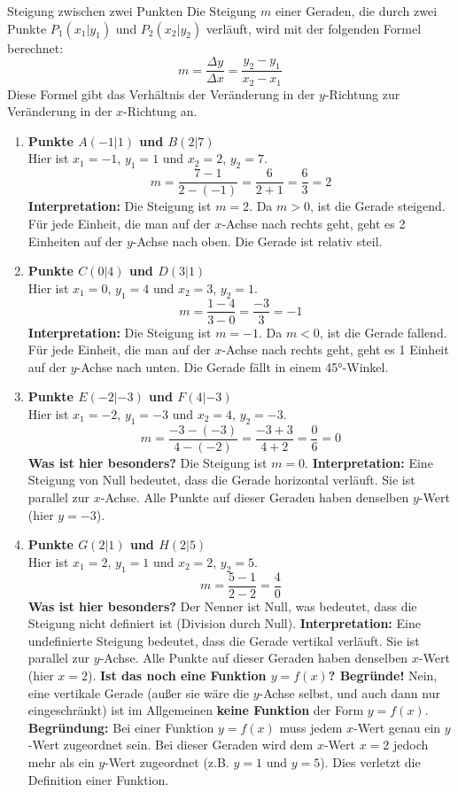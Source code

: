 \begin{loesungsumgebung}{Steigung zwischen zwei Punkten}
Die Steigung $m$ einer Geraden, die durch zwei Punkte $P_1(x_1|y_1)$ und $P_2(x_2|y_2)$ verläuft, wird mit der folgenden Formel berechnet:
$$ m = \frac{\Delta y}{\Delta x} = \frac{y_2 - y_1}{x_2 - x_1} $$
Diese Formel gibt das Verhältnis der Veränderung in der $y$-Richtung zur Veränderung in der $x$-Richtung an.

\begin{enumerate}
    \item \textbf{Punkte $A(-1|1)$ und $B(2|7)$} \\
    Hier ist $x_1 = -1$, $y_1 = 1$ und $x_2 = 2$, $y_2 = 7$.
    $$ m = \frac{7 - 1}{2 - (-1)} = \frac{6}{2 + 1} = \frac{6}{3} = 2 $$
    \textbf{Interpretation:} Die Steigung ist $m=2$. Da $m > 0$, ist die Gerade steigend. Für jede Einheit, die man auf der $x$-Achse nach rechts geht, geht es 2 Einheiten auf der $y$-Achse nach oben. Die Gerade ist relativ steil.

    \item \textbf{Punkte $C(0|4)$ und $D(3|1)$} \\
    Hier ist $x_1 = 0$, $y_1 = 4$ und $x_2 = 3$, $y_2 = 1$.
    $$ m = \frac{1 - 4}{3 - 0} = \frac{-3}{3} = -1 $$
    \textbf{Interpretation:} Die Steigung ist $m=-1$. Da $m < 0$, ist die Gerade fallend. Für jede Einheit, die man auf der $x$-Achse nach rechts geht, geht es 1 Einheit auf der $y$-Achse nach unten. Die Gerade fällt in einem 45°-Winkel.

    \item \textbf{Punkte $E(-2|-3)$ und $F(4|-3)$} \\
    Hier ist $x_1 = -2$, $y_1 = -3$ und $x_2 = 4$, $y_2 = -3$.
    $$ m = \frac{-3 - (-3)}{4 - (-2)} = \frac{-3 + 3}{4 + 2} = \frac{0}{6} = 0 $$
    \textbf{Was ist hier besonders?} Die Steigung ist $m=0$.
    \textbf{Interpretation:} Eine Steigung von Null bedeutet, dass die Gerade horizontal verläuft. Sie ist parallel zur $x$-Achse. Alle Punkte auf dieser Geraden haben denselben $y$-Wert (hier $y=-3$).

    \item \textbf{Punkte $G(2|1)$ und $H(2|5)$} \\
    Hier ist $x_1 = 2$, $y_1 = 1$ und $x_2 = 2$, $y_2 = 5$.
    $$ m = \frac{5 - 1}{2 - 2} = \frac{4}{0} $$
    \textbf{Was ist hier besonders?} Der Nenner ist Null, was bedeutet, dass die Steigung nicht definiert ist (Division durch Null).
    \textbf{Interpretation:} Eine undefinierte Steigung bedeutet, dass die Gerade vertikal verläuft. Sie ist parallel zur $y$-Achse. Alle Punkte auf dieser Geraden haben denselben $x$-Wert (hier $x=2$).
    \textbf{Ist das noch eine Funktion $y=f(x)$? Begründe!}
    Nein, eine vertikale Gerade (außer sie wäre die $y$-Achse selbst, und auch dann nur eingeschränkt) ist im Allgemeinen \textbf{keine Funktion} der Form $y=f(x)$.
    \textbf{Begründung:} Bei einer Funktion $y=f(x)$ muss jedem $x$-Wert genau ein $y$-Wert zugeordnet sein. Bei dieser Geraden wird dem $x$-Wert $x=2$ jedoch mehr als ein $y$-Wert zugeordnet (z.B. $y=1$ und $y=5$). Dies verletzt die Definition einer Funktion.
\end{enumerate}


\end{loesungsumgebung}
